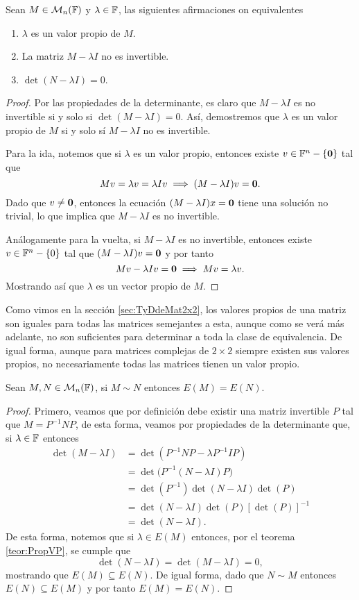 \begin{teor}\label{teor:PropVP}
  Sean $M \in \mathcal{M}_n(\mathbb{F})$ y $\lambda \in \mathbb{F}$, las siguientes afirmaciones on equivalentes
  \begin{enumerate}
    \item $\lambda$ es un valor propio de $M$.
    \item La matriz $M-\lambda I$ no es invertible.
    \item $\det(N-\lambda I) = 0$.
  \end{enumerate}
\end{teor}
\begin{proof}
  Por las propiedades de la determinante, es claro que $M-\lambda I$ es no invertible si y solo si $\det(M-\lambda I)=0$. Así, demostremos que $\lambda$ es un valor propio de $M$ si y solo sí $M-\lambda I$ no es invertible.

  Para la ida, notemos que si $\lambda$ es un valor propio, entonces existe $v \in \mathbb{F}^n-\{\mathbf{0}\}$ tal que 
    \[ Mv=\lambda v = \lambda Iv \implies (M-\lambda I)v = \mathbf{0}. \]
  Dado que $v \neq \mathbf{0}$, entonces la ecuación $(M-\lambda I)x = \mathbf{0}$ tiene una solución no trivial, lo que implica que $M-\lambda I$ es no invertible.

  Análogamente para la vuelta, si $M-\lambda I$ es no invertible, entonces existe $v \in \mathbb{F}^n-\{0\}$ tal que $(M-\lambda I)v = \mathbf{0}$ y por tanto
  \[ Mv - \lambda Iv = \mathbf{0} \implies Mv = \lambda v. \]
  Mostrando así que $\lambda$ es un vector propio de $M$.
\end{proof}

Como vimos en la sección \ref{sec:TyDdeMat2x2}, los valores propios de una matriz son iguales para todas las matrices semejantes a esta, aunque como se verá más adelante, no son suficientes para determinar a toda la clase de equivalencia. De igual forma, aunque para matrices complejas de $2\times 2$ siempre existen sus valores propios, no necesariamente todas las matrices tienen un valor propio.

\begin{coro}
  Sean $M,N \in \mathcal{M}_n(\mathbb{F})$, si $M \sim N$ entonces $E(M) = E(N)$.
\end{coro}
\begin{proof}
  Primero, veamos que por definición debe existir una matriz invertible $P$ tal que $M = P^{-1} N P$, de esta forma, veamos por propiedades de la determinante que, si $\lambda \in \mathbb{F}$ entonces
  \begin{align*}
    \det(M - \lambda I) &= \det(P^{-1}NP - \lambda P^{-1}IP) \\
      &= \det\bigl(P^{-1}(N-\lambda I)P\bigr) \\
      &= \det(P^{-1})\det(N-\lambda I) \det(P) \\
      &= \det(N-\lambda I) \det(P) [\det(P)]^{-1} \\
      &= \det(N-\lambda I).
  \end{align*}
  De esta forma, notemos que si $\lambda \in E(M)$ entonces, por el teorema \ref{teor:PropVP}, se cumple que 
  \[\det(N - \lambda I) = \det(M - \lambda I) = 0,\]
  mostrando que $E(M) \subseteq E(N)$. De igual forma, dado que $N \sim M$ entonces $E(N) \subseteq E(M)$ y por tanto $E(M) = E(N)$.
\end{proof}
